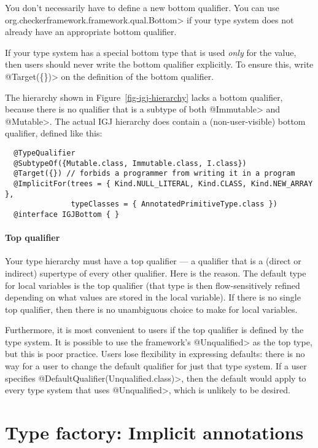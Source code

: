 You don't necessarily have to define a new bottom qualifier.  You can
use \<org.checkerframework.framework.qual.Bottom> if your type system does not already have an
appropriate bottom qualifier.

If your type system has a special bottom type that is used \emph{only} for
the  value, then users should never write the bottom qualifier
explicitly.  To ensure this, write \<@Target(\{\})> on the definition of
the bottom qualifier.


The hierarchy shown in Figure~\ref{fig-igj-hierarchy} lacks
a bottom qualifier, because there is no qualifier that is a subtype of both
\<@Immutable> and \<@Mutable>.
The actual IGJ hierarchy does contain a (non-user-visible) bottom qualifier,
defined like this:

\begin{Verbatim}
  @TypeQualifier
  @SubtypeOf({Mutable.class, Immutable.class, I.class})
  @Target({}) // forbids a programmer from writing it in a program
  @ImplicitFor(trees = { Kind.NULL_LITERAL, Kind.CLASS, Kind.NEW_ARRAY },
               typeClasses = { AnnotatedPrimitiveType.class })
  @interface IGJBottom { }
\end{Verbatim}


\paragraph{Top qualifier\label{top-qualifier}}
Your type hierarchy must have a top qualifier
--- a qualifier that is a (direct or indirect) supertype of every other
qualifier.
Here is the reason.
The default type for local variables is the top
qualifier (that type is then flow-sensitively
refined depending on what values are stored in the local variable).
If there is no single top qualifier, then there is no
unambiguous choice to make for local variables.

Furthermore, it is most convenient to users if the top qualifier is defined
by the type system.  It is possible to use the framework's
\<@Unqualified> as the top type, but this is poor practice.
Users lose
flexibility in expressing defaults:  there is no
way for a user to change the default qualifier for just that type system.
If a user specifies
\<@DefaultQualifier(Unqualified.class)>,
then the default would apply to every
type system that uses \<@Unqualified>, which is unlikely to be desired.


\section{Type factory: Implicit annotations\label{writing-type-introduction}}

